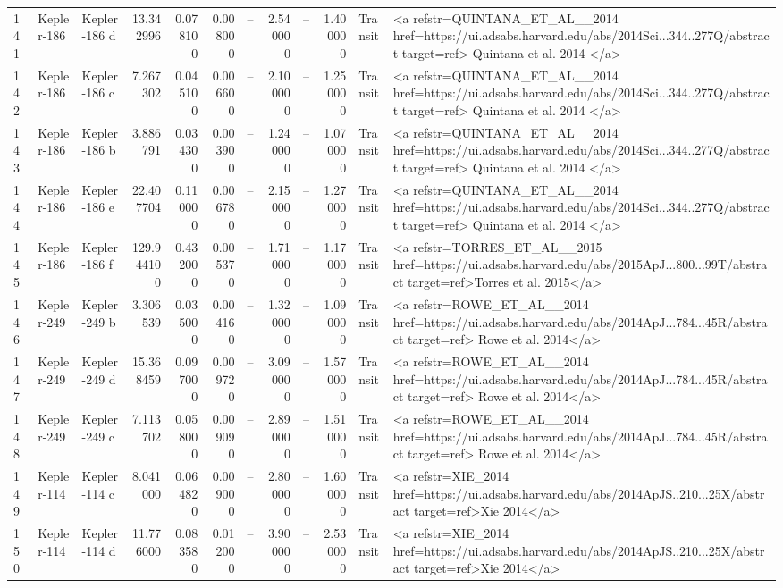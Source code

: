 \begin{tabular}{lllrrrrrrrll}
141 & Kepler-186 & Kepler-186 d & 13.342996 & 0.078100 & 0.008000 & -- & 2.540000 & -- & 1.400000 & Transit & <a refstr=QUINTANA_ET_AL__2014 href=https://ui.adsabs.harvard.edu/abs/2014Sci...344..277Q/abstract target=ref> Quintana et al. 2014 </a> \\
142 & Kepler-186 & Kepler-186 c & 7.267302 & 0.045100 & 0.006600 & -- & 2.100000 & -- & 1.250000 & Transit & <a refstr=QUINTANA_ET_AL__2014 href=https://ui.adsabs.harvard.edu/abs/2014Sci...344..277Q/abstract target=ref> Quintana et al. 2014 </a> \\
143 & Kepler-186 & Kepler-186 b & 3.886791 & 0.034300 & 0.003900 & -- & 1.240000 & -- & 1.070000 & Transit & <a refstr=QUINTANA_ET_AL__2014 href=https://ui.adsabs.harvard.edu/abs/2014Sci...344..277Q/abstract target=ref> Quintana et al. 2014 </a> \\
144 & Kepler-186 & Kepler-186 e & 22.407704 & 0.110000 & 0.006780 & -- & 2.150000 & -- & 1.270000 & Transit & <a refstr=QUINTANA_ET_AL__2014 href=https://ui.adsabs.harvard.edu/abs/2014Sci...344..277Q/abstract target=ref> Quintana et al. 2014 </a> \\
145 & Kepler-186 & Kepler-186 f & 129.944100 & 0.432000 & 0.005370 & -- & 1.710000 & -- & 1.170000 & Transit & <a refstr=TORRES_ET_AL__2015 href=https://ui.adsabs.harvard.edu/abs/2015ApJ...800...99T/abstract target=ref>Torres et al. 2015</a> \\
146 & Kepler-249 & Kepler-249 b & 3.306539 & 0.035000 & 0.004160 & -- & 1.320000 & -- & 1.090000 & Transit & <a refstr=ROWE_ET_AL__2014 href=https://ui.adsabs.harvard.edu/abs/2014ApJ...784...45R/abstract target=ref> Rowe et al. 2014</a> \\
147 & Kepler-249 & Kepler-249 d & 15.368459 & 0.097000 & 0.009720 & -- & 3.090000 & -- & 1.570000 & Transit & <a refstr=ROWE_ET_AL__2014 href=https://ui.adsabs.harvard.edu/abs/2014ApJ...784...45R/abstract target=ref> Rowe et al. 2014</a> \\
148 & Kepler-249 & Kepler-249 c & 7.113702 & 0.058000 & 0.009090 & -- & 2.890000 & -- & 1.510000 & Transit & <a refstr=ROWE_ET_AL__2014 href=https://ui.adsabs.harvard.edu/abs/2014ApJ...784...45R/abstract target=ref> Rowe et al. 2014</a> \\
149 & Kepler-114 & Kepler-114 c & 8.041000 & 0.064820 & 0.009000 & -- & 2.800000 & -- & 1.600000 & Transit & <a refstr=XIE_2014 href=https://ui.adsabs.harvard.edu/abs/2014ApJS..210...25X/abstract target=ref>Xie 2014</a> \\
150 & Kepler-114 & Kepler-114 d & 11.776000 & 0.083580 & 0.012000 & -- & 3.900000 & -- & 2.530000 & Transit & <a refstr=XIE_2014 href=https://ui.adsabs.harvard.edu/abs/2014ApJS..210...25X/abstract target=ref>Xie 2014</a> \\

\end{tabular}
